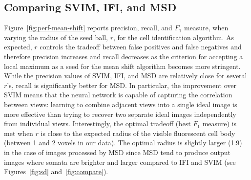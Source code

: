 \documentclass[smallextended]{svjour3}       %
\begin{document}
\subsection{Comparing SVIM, IFI, and MSD}
\label{sec:performance}

Figure~\ref{fig:perf-mean-shift} reports precision, recall, and $F_1$
measure, when varying the radius of the seed ball, $r$, for the cell
identification algorithm.  As expected, $r$ controls the
tradeoff between false positives and false negatives and therefore
precision increases and recall decreases as the criterion for
accepting a local maximum as a seed for the mean shift algorithm
becomes more stringent. While the precision values of SVIM, IFI, and
MSD are relatively close for several $r$'s, recall is significantly
better for MSD. In particular, the improvement over SVIM means that
the neural network is capable of capturing the correlation between
views: learning to combine adjacent views into a single ideal image is
more effective than trying to recover two separate ideal images
independently from individual views.  Interestingly, the optimal
tradeoff (best
$F_1$ measure) is met when $r$ is close to the expected radius of
the visible fluorescent cell body (between 1 and 2 voxels in our data).
The optimal radius is slightly larger (1.9) in the case of
images processed by MSD since MSD tend to produce output images where
somata are brighter and larger compared to IFI and SVIM (see
Figures~\ref{fig:sd} and~\ref{fig:compare}).
\end{document}
